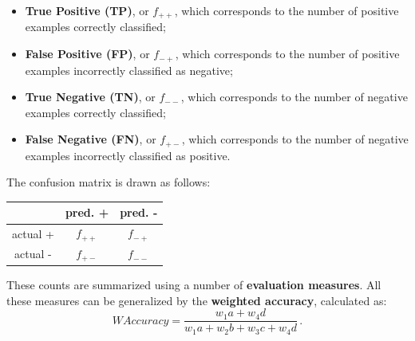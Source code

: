 \begin{itemize}
    \item \textbf{True Positive (TP)}, or $f_{++}$, which corresponds to the number of positive examples correctly classified;

    \item \textbf{False Positive (FP)}, or $f_{-+}$, which corresponds to the number of positive examples incorrectly classified as negative;

    \item \textbf{True Negative (TN)}, or $f_{--}$, which corresponds to the number of negative examples correctly classified;

    \item \textbf{False Negative (FN)}, or $f_{+-}$, which corresponds to the number of negative examples incorrectly classified as positive.
\end{itemize}

The confusion matrix is drawn as follows:

\begin{table}[h]
    \centering
    \begin{tabular}{|c|c|c|}
         \hline
         & pred. + & pred. - \\
        \hline
        actual + & $f_{++}$ & $f_{-+}$\\
        \hline
        actual - & $f_{+-}$ & $f_{--}$\\
        \hline
    \end{tabular}
\end{table}

These counts are summarized using a number of \textbf{evaluation measures}.
All these measures can be generalized by the \textbf{weighted accuracy}, calculated as:
\begin{equation*}
    WAccuracy = \dfrac{w_1a + w_4d}{w_1a + w_2b + w_3c + w_4d} \, .
\end{equation*}

